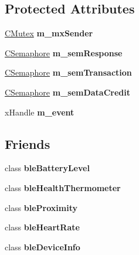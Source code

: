 \subsection*{Protected Attributes}
\begin{DoxyCompactItemize}
\item 
\hypertarget{classble_serial_a6c5599ef6d87b963cf31b76a905edad8}{\hyperlink{class_c_mutex}{C\-Mutex} {\bfseries m\-\_\-mx\-Sender}}\label{classble_serial_a6c5599ef6d87b963cf31b76a905edad8}

\item 
\hypertarget{classble_serial_a7030ce130685a3b93a2b60ddec90892d}{\hyperlink{class_c_semaphore}{C\-Semaphore} {\bfseries m\-\_\-sem\-Response}}\label{classble_serial_a7030ce130685a3b93a2b60ddec90892d}

\item 
\hypertarget{classble_serial_a1c7f0d39703e1dc7e95805f89264811a}{\hyperlink{class_c_semaphore}{C\-Semaphore} {\bfseries m\-\_\-sem\-Transaction}}\label{classble_serial_a1c7f0d39703e1dc7e95805f89264811a}

\item 
\hypertarget{classble_serial_a41f2365e5b20a18d7cf3eccd7c199045}{\hyperlink{class_c_semaphore}{C\-Semaphore} {\bfseries m\-\_\-sem\-Data\-Credit}}\label{classble_serial_a41f2365e5b20a18d7cf3eccd7c199045}

\item 
\hypertarget{classble_serial_ae1eb070b2ed9876c97101c9668673acf}{x\-Handle {\bfseries m\-\_\-event}}\label{classble_serial_ae1eb070b2ed9876c97101c9668673acf}

\end{DoxyCompactItemize}
\subsection*{Friends}
\begin{DoxyCompactItemize}
\item 
\hypertarget{classble_serial_a593ede5a9a24dc216e23a1ac428ca589}{class {\bfseries ble\-Battery\-Level}}\label{classble_serial_a593ede5a9a24dc216e23a1ac428ca589}

\item 
\hypertarget{classble_serial_aee0cca94122d7b10213ee824fa02cff4}{class {\bfseries ble\-Health\-Thermometer}}\label{classble_serial_aee0cca94122d7b10213ee824fa02cff4}

\item 
\hypertarget{classble_serial_aab82c92d8b6e23ab6a8db778622935e2}{class {\bfseries ble\-Proximity}}\label{classble_serial_aab82c92d8b6e23ab6a8db778622935e2}

\item 
\hypertarget{classble_serial_a58295b42e6de2341fbfa693af9988b80}{class {\bfseries ble\-Heart\-Rate}}\label{classble_serial_a58295b42e6de2341fbfa693af9988b80}

\item 
\hypertarget{classble_serial_a31c079f97a14d6845ca153115a69b6ce}{class {\bfseries ble\-Device\-Info}}\label{classble_serial_a31c079f97a14d6845ca153115a69b6ce}

\end{DoxyCompactItemize}
